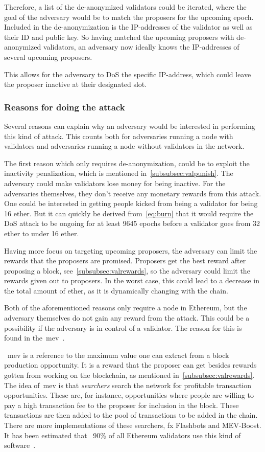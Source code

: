 Therefore, a list of the de-anonymized validators could be iterated,
where the goal of the adversary would be to match the proposers for the upcoming epoch.
Included in the de-anonymization is the IP-addresses of the validator as well as their ID and public key.
So having matched the upcoming proposers with de-anonymized validators,
an adversary now ideally knows the IP-addresses of several upcoming proposers.

This allows for the adversary to DoS the specific IP-address,
which could leave the proposer inactive at their designated slot.

\subsubsection{Reasons for doing the attack}

Several reasons can explain why an adversary would be interested in performing this kind of attack.
This counts both for adversaries running a node with validators and adversaries running a node without validators in the network.


The first reason which only requires de-anonymization, could be to exploit the inactivity penalization,
which is mentioned in~\autoref{subsubsec:valpunish}.
The adversary could make validators lose money for being inactive.
For the adversaries themselves, they don't receive any monetary rewards from this attack. 
One could be interested in getting people kicked from being a validator for being 16 ether.
But it can quickly be derived from~\autoref{eq:burn} that it would require the DoS attack
to be ongoing for at least 9645 epochs before a validator goes from 32 ether to under 16 ether.


Having more focus on targeting upcoming proposers, the adversary can limit the rewards that the proposers are promised.
Proposers get the best reward after proposing a block, see~\autoref{subsubsec:valrewards},
so the adversary could limit the rewards given out to proposers.
In the worst case, this could lead to a decrease in the total amount of ether,
as it is dynamically changing with the chain.


Both of the aforementioned reasons only require a node in Ethereum,
but the adversary themselves do not gain any reward from the attack.
This could be a possibility if the adversary is in control of a validator.
The reason for this is found in the~\gls{mev}~\cite{mev}.

~\gls{mev} is a reference to the maximum value one can extract from a block production opportunity.
It is a reward that the proposer can get besides rewards gotten from working on the blockchain,
as mentioned in~\autoref{subsubsec:valrewards}.
The idea of~\gls{mev} is that \textit{searchers} search the network for profitable transaction opportunities.
These are, for instance,
opportunities where people are willing to pay a high transaction fee to the proposer for inclusion in the block.
These transactions are then added to the pool of transactions to be added in the chain.
There are more implementations of these searchers, fx Flashbots and MEV-Boost.
It has been estimated that ~90\% of all Ethereum validators use this kind of software~\cite{cryptoeprint:2023/760}.

